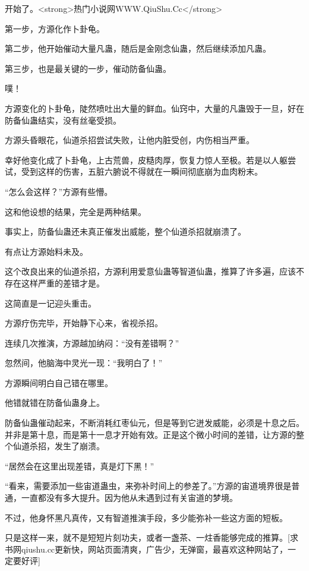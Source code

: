 
\begin{this_body}

开始了。<strong>热门小说网WWW.QiuShu.Cc</strong>

第一步，方源化作卜卦龟。

第二步，他开始催动大量凡蛊，随后是金刚念仙蛊，然后继续添加凡蛊。

第三步，也是最关键的一步，催动防备仙蛊。

噗！

方源变化的卜卦龟，陡然喷吐出大量的鲜血。仙窍中，大量的凡蛊毁于一旦，好在防备仙蛊结实，没有丝毫受损。

方源头昏眼花，仙道杀招尝试失败，让他内脏受创，内伤相当严重。

幸好他变化成了卜卦龟，上古荒兽，皮糙肉厚，恢复力惊人至极。若是以人躯尝试，受到这样的伤害，五脏六腑说不得就在一瞬间彻底崩为血肉粉末。

“怎么会这样？”方源有些懵。

这和他设想的结果，完全是两种结果。

事实上，防备仙蛊还未真正催发出威能，整个仙道杀招就崩溃了。

有点让方源始料未及。

这个改良出来的仙道杀招，方源利用爱意仙蛊等智道仙蛊，推算了许多遍，应该不存在这样严重的差错才是。

这简直是一记迎头重击。

方源疗伤完毕，开始静下心来，省视杀招。

连续几次推演，方源越加纳闷：“没有差错啊？”

忽然间，他脑海中灵光一现：“我明白了！”

方源瞬间明白自己错在哪里。

他错就错在防备仙蛊身上。

防备仙蛊催动起来，不断消耗红枣仙元，但是等到它迸发威能，必须是十息之后。并非是第十息，而是第十一息才开始有效。正是这个微小时间的差错，让方源的整个仙道杀招，发生了崩溃。

“居然会在这里出现差错，真是灯下黑！”

“看来，需要添加一些宙道蛊虫，来弥补时间上的参差了。”方源的宙道境界很是普通，一直都没有多大提升。因为他从未遇到过有关宙道的梦境。

不过，他身怀黑凡真传，又有智道推演手段，多少能弥补一些这方面的短板。

只是这样一来，就不是短短片刻功夫，或者一盏茶、一炷香能够完成的推算。[求书网qiushu.cc更新快，网站页面清爽，广告少，无弹窗，最喜欢这种网站了，一定要好评]


\end{this_body}
